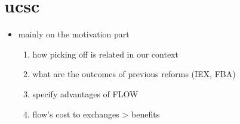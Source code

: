 \documentclass[letter]{article}
\begin{document}
\section{ucsc}
\begin{itemize}
    \item mainly on the motivation part
        \begin{enumerate}
            \item how picking off is related in our context
            \item what are the outcomes of previous reforms (IEX, FBA)
            \item specify advantages of FLOW
            \item flow's cost to exchanges > benefits
        \end{enumerate}
\end{itemize}
\end{document}
